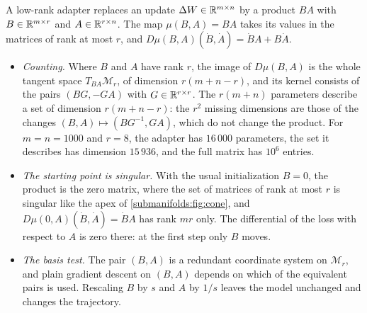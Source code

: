\begin{notechapter}
\begin{mlthread}
A low-rank adapter replaces an update $\Delta W\in\mathbb{R}^{m\times n}$ by a
product $BA$ with $B\in\mathbb{R}^{m\times r}$ and $A\in\mathbb{R}^{r\times n}$. The map
$\mu(B, A) = BA$ takes its values in the matrices of rank at most $r$,
and $D\mu(B, A)(\dot B, \dot A) = \dot BA + B\dot A$.
\begin{itemize}[nosep]
  \item \emph{Counting.} Where $B$ and $A$ have rank $r$, the image of
        $D\mu(B, A)$ is the whole tangent space $T_{BA}\mathcal M_r$, of
        dimension $r(m + n - r)$, and its kernel consists of the pairs
        $(BG, -GA)$ with $G\in\mathbb{R}^{r\times r}$. The $r(m + n)$ parameters
        describe a set of dimension $r(m + n - r)$: the $r^2$ missing
        dimensions are those of the changes $(B, A)\mapsto(BG^{-1}, GA)$,
        which do not change the product. For $m = n = 1000$ and $r = 8$,
        the adapter has $16\,000$ parameters, the set it describes has
        dimension $15\,936$, and the full matrix has $10^6$ entries.
  \item \emph{The starting point is singular.} With the usual
        initialization $B = 0$, the product is the zero matrix, where the
        set of matrices of rank at most $r$ is singular like the apex of
        \cref{submanifolds:fig:cone}, and
        $D\mu(0, A)(\dot B, \dot A) = \dot BA$ has rank $mr$ only. The
        differential of the loss with respect to $A$ is zero there: at
        the first step only $B$ moves.
  \item \emph{The basis test.} The pair $(B, A)$ is a redundant
        coordinate system on $\mathcal M_r$, and plain gradient descent on
        $(B, A)$ depends on which of the equivalent pairs is used.
        Rescaling $B$ by $s$ and $A$ by $1/s$ leaves the model unchanged
        and changes the trajectory.
\end{itemize}
\end{mlthread}


\end{notechapter}

